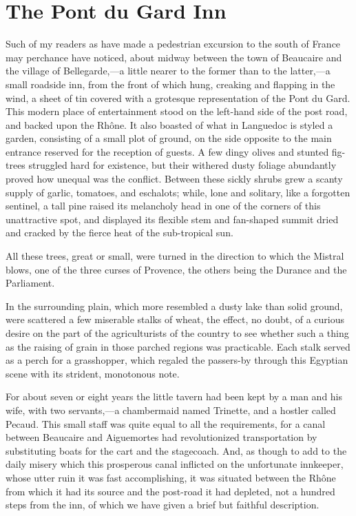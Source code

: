 \chapter{The Pont du Gard Inn}

Such of my readers as have made a pedestrian excursion to the south of
France may perchance have noticed, about midway between the town of
Beaucaire and the village of Bellegarde,—a little nearer to the former
than to the latter,—a small roadside inn, from the front of which hung,
creaking and flapping in the wind, a sheet of tin covered with a
grotesque representation of the Pont du Gard. This modern place of
entertainment stood on the left-hand side of the post road, and backed
upon the Rhône. It also boasted of what in Languedoc is styled a
garden, consisting of a small plot of ground, on the side opposite to
the main entrance reserved for the reception of guests. A few dingy
olives and stunted fig-trees struggled hard for existence, but their
withered dusty foliage abundantly proved how unequal was the conflict.
Between these sickly shrubs grew a scanty supply of garlic, tomatoes,
and eschalots; while, lone and solitary, like a forgotten sentinel, a
tall pine raised its melancholy head in one of the corners of this
unattractive spot, and displayed its flexible stem and fan-shaped
summit dried and cracked by the fierce heat of the sub-tropical sun.

All these trees, great or small, were turned in the direction to which
the Mistral blows, one of the three curses of Provence, the others
being the Durance and the Parliament.

In the surrounding plain, which more resembled a dusty lake than solid
ground, were scattered a few miserable stalks of wheat, the effect, no
doubt, of a curious desire on the part of the agriculturists of the
country to see whether such a thing as the raising of grain in those
parched regions was practicable. Each stalk served as a perch for a
grasshopper, which regaled the passers-by through this Egyptian scene
with its strident, monotonous note.

For about seven or eight years the little tavern had been kept by a man
and his wife, with two servants,—a chambermaid named Trinette, and a
hostler called Pecaud. This small staff was quite equal to all the
requirements, for a canal between Beaucaire and Aiguemortes had
revolutionized transportation by substituting boats for the cart and
the stagecoach. And, as though to add to the daily misery which this
prosperous canal inflicted on the unfortunate innkeeper, whose utter
ruin it was fast accomplishing, it was situated between the Rhône from
which it had its source and the post-road it had depleted, not a
hundred steps from the inn, of which we have given a brief but faithful
description.

